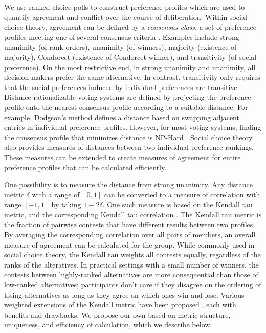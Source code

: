 We use ranked-choice polls to construct preference profiles which are used to quantify agreement and conflict over the course of deliberation.
Within social choice theory, agreement can be defined by a {\em consensus class},
a set of preference profiles meeting one of several consensus criteria
\cite{elkind_rationalizations_2016}.
Examples include strong unanimity (of rank orders),
unanimity (of winners),
majority (existence of majority),
Condorcet (existence of Condorcet winner),
and transitivity (of social preference).
On the most restrictive end, in strong unanimity and unanimity,
all decision-makers prefer the same alternative.
In contrast, transitivity only requires that the social preferences induced by
individual preferences are transitive.
Distance-rationalizable voting systems are defined by projecting the preference
profile onto the nearest consensus profile according to a suitable distance.
For example, Dodgson's method \cite{dodgson_method_1876, brandt_computational_2012}
defines a distance based on swapping adjacent entries in individual preference profiles.
However, for most voting systems,
finding the consensus profile that minimizes distance is NP-Hard
\cite{elkind_rationalizations_2016}.
Social choice theory also provides measures of distances between two individual
preference rankings.
These measures can be extended to create measures of agreement for entire
preference profiles that can be calculated efficiently.

One possibility is to measure the distance from strong unanimity.
Any distance metric $\delta$ with a range of $[0,1]$ can be converted to a measure of correlation with range $[-1, 1]$ by taking $1 - 2\delta$.
One such measure is based on the Kendall tau metric, and the corresponding Kendall tau correlation \cite{kendall_new_1938}.
The Kendall tau metric is the fraction of pairwise contests that have different results between two profiles.
By averaging the corresponding correlation over all pairs of members, an overall measure of agreement can be calculated for the group.
While commonly used in social choice theory, the Kendall tau weights all contests equally, regardless of the ranks of the alteratives.
In practical settings with a small number of winners, the contests between highly-ranked alternatives are more consequential than those of low-ranked alternatives;
participants don't care if they disagree on the ordering of losing alternatives as long as they agree on which ones win and lose.
Various weighted extensions of the Kendall metric have been proposed \cite{shieh_weighted_1998, can_weighted_2014},
each with benefits and drawbacks.
We propose our own based on metric structure, uniqueness, and efficiency of calculation, which we describe below.

